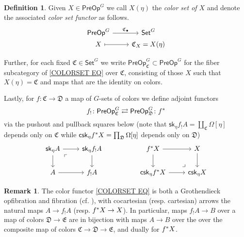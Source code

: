\documentclass[a4paper,10pt
,draft
]{article}%
\numberwithin{equation}{section}
\numberwithin{figure}{section}
\theoremstyle{definition} %
\newtheorem{definition}[equation]{Definition}%
\newtheorem{remark}[equation]{Remark}%
\newcommand{\1}{\ensuremath{\mathbbm 1}}%
\begin{document}
\begin{definition}
	Given $X \in \mathsf{PreOp}^G$ we call $X(\eta)$ the 
	\emph{color set of $X$}
	and denote the associated \emph{color set functor} as follows.
	\begin{equation}\label{COLORSET EQ}
	\begin{tikzcd}[row sep=0]
	\mathsf{PreOp}^G \ar{r}{\mathfrak{C}_{\bullet}} &
	\mathsf{Set}^G
	\\
	X \ar[mapsto]{r} &
	\mathfrak{C}_X = X(\eta)
	\end{tikzcd}
	\end{equation}

Further, for each fixed $\mathfrak{C} \in \mathsf{Set}^G$ we write 
$\mathsf{PreOp}^G_{\mathfrak{C}} \subset \mathsf{PreOp}^G$
for the fiber subcategory of 
\eqref{COLORSET EQ}
over $\mathfrak{C}$,
consisting of those $X$
such that $X(\eta) = \mathfrak{C}$
and maps that are the identity on colors.	
	
	
	Lastly, for $f \colon \mathfrak{C} \to \mathfrak{D}$
	a map of $G$-sets of colors
	we define adjoint functors
\begin{equation}\label{PREOPCOLCH EQ}
	f_{!} \colon
	\mathsf{PreOp}^{G}_{\mathfrak{C}}
	\rightleftarrows
	\mathsf{PreOp}^{G}_{\mathfrak{D}}
	\colon f^{\**}
\end{equation}
	via the pushout and pullback squares below
	(note that 
	$\mathsf{sk}_{\eta} f_! A = \coprod_{\mathfrak{C}} \Omega[\eta]$ depends only on 
	$\mathfrak{C}$ while 
	$\mathsf{csk}_{\eta} f^{\**} X
	= \prod_{\mathfrak{D}} \Omega[\eta]$ depends only on
	$\mathfrak{D}$)
	\[
	\begin{tikzcd}
	\mathsf{sk}_{\eta} A \ar{r} \ar{d} \arrow[dr, phantom, "\ulcorner", very near start]  &
	\mathsf{sk}_{\eta} f_! A \ar{d}
	&&
	f^{\**} X \ar{r} \ar{d} &
	X \ar{d}
	\\
	A \ar{r} & 
	f_! A
	&&
	\mathsf{csk}_{\eta} f^{\**} X \ar{r} & 
	\mathsf{csk}_{\eta} X
	\arrow[ul, phantom, "\lrcorner", very near start]
	\end{tikzcd}
	\]
\end{definition}



\begin{remark}\label{GROTHFIBOP REM}
	The color functor \eqref{COLORSET EQ}
	is both a Grothendieck opfibration and fibration
	(cf. \cite[\S \ref{OC-GROTFIB SEC}]{BP_FCOP}),
	with cocartesian (resp. cartesian) arrows the natural maps
	$A \to f_! A$ (resp. $f^{\**} X \to X$).
	In particular, maps
	$f_! A \to B$ over a
	map of colors $\mathfrak{D} \to \mathfrak{E}$
	are in bijection with maps
	$A \to B$ over the
	over the composite map of colors $\mathfrak{C} \to \mathfrak{D} \to \mathfrak{E}$,
	and dually for $f^{\**} X$.
\end{remark}
\end{document}
